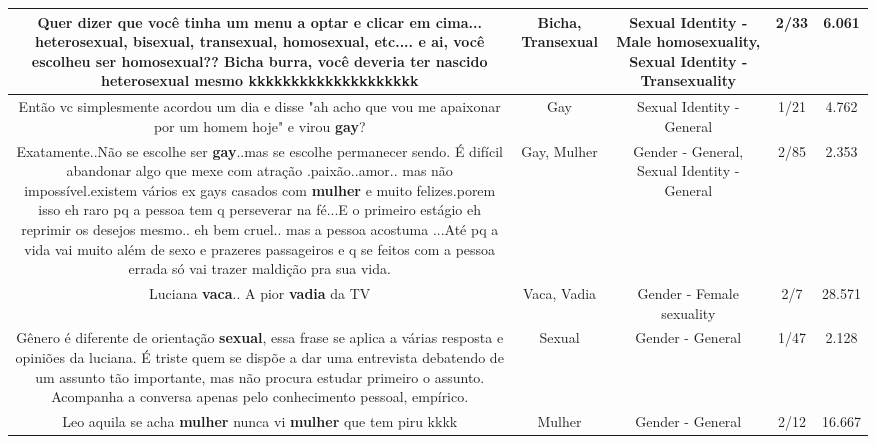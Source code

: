 \documentclass[11pt]{article}
\newlength\mylength
\begin{document}
\begin{center}
\begin{longtable}{|C{.65\mylength}|C{.30\mylength}|C{.12\mylength}|C{.12\mylength}|C{.12\mylength}|}
  \small Quer dizer que você tinha um menu a optar e clicar em cima... heterosexual, bisexual, \textbf{transexual}, homosexual, etc.... e ai, você escolheu ser homosexual??  \textbf{Bicha} burra, você deveria ter nascido heterosexual mesmo   kkkkkkkkkkkkkkkkkkkk\normalsize   & Bicha, Transexual & Sexual Identity - Male homosexuality, Sexual Identity - Transexuality & 2/33 & 6.061 \\  \hline
  \small Então vc simplesmente acordou um dia e disse "ah acho que vou me apaixonar por um homem hoje" e virou \textbf{gay}?\normalsize   & Gay & Sexual Identity - General & 1/21 & 4.762 \\  \hline
  \small Exatamente..Não se escolhe ser \textbf{gay}..mas se escolhe permanecer sendo. É difícil abandonar algo que mexe com atração .paixão..amor.. mas não impossível.existem vários ex gays casados com \textbf{mulher} e muito felizes.porem isso eh raro pq a pessoa tem q perseverar na fé...E o primeiro estágio eh reprimir os desejos mesmo.. eh bem cruel.. mas a pessoa acostuma ...Até pq a vida vai muito além de sexo e prazeres passageiros e q se feitos com a pessoa errada só vai trazer maldição pra sua vida.\normalsize   & Gay, Mulher & Gender - General, Sexual Identity - General & 2/85 & 2.353 \\  \hline
  \small Luciana \textbf{vaca}.. A pior \textbf{vadia} da TV\normalsize   & Vaca, Vadia & Gender - Female sexuality & 2/7 & 28.571 \\  \hline
  \small Gênero é diferente de orientação \textbf{sexual}, essa frase se aplica a várias resposta e opiniões da luciana. É triste quem se dispõe a dar uma entrevista debatendo de um assunto tão importante, mas não procura estudar primeiro o assunto. Acompanha a conversa apenas pelo conhecimento pessoal, empírico.\normalsize   & Sexual & Gender - General & 1/47 & 2.128 \\  \hline
  \small Leo aquila se acha \textbf{mulher} nunca vi \textbf{mulher} que tem piru kkkk\normalsize   & Mulher & Gender - General & 2/12 & 16.667 \\  \hline

\end{longtable}
\end{center}
\end{document}
